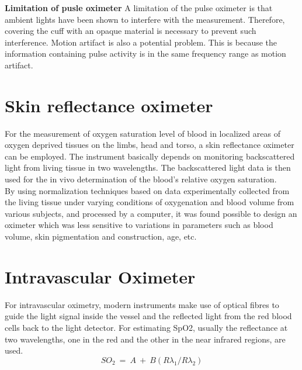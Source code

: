 \documentclass{article}
\begin{document}
\textbf{Limitation of pusle oximeter} A limitation of the pulse oximeter is that ambient lights have been shown to interfere with the measurement. Therefore, covering the cuff with an opaque material is necessary to prevent such interference. Motion artifact is also a potential problem. This is because the information containing pulse activity is in the same frequency range as motion artifact.
\section{Skin reflectance oximeter}
For the measurement of oxygen saturation level of blood in localized areas of oxygen deprived tissues on the limbs, head and torso, a skin reflectance oximeter can be employed. The instrument basically depends on monitoring backscattered light from living tissue in two wavelengths. The backscattered light data is then used for the in vivo determination of the blood’s relative oxygen saturation.\\
By using normalization techniques based on data experimentally collected from the living tissue under varying conditions of oxygenation and blood volume from various subjects, and processed by a computer, it was found possible to design an oximeter which was less sensitive to variations in parameters such as blood volume, skin pigmentation and construction, age, etc.
\section{Intravascular Oximeter}
For intravascular oximetry, modern instruments make use of optical fibres to guide the light signal inside the vessel and the reflected light from the red blood cells back to the light detector. For estimating SpO2, usually the reflectance at two wavelengths, one in the red and the other in the near infrared regions, are used.
\begin{equation}
    SO_2 \: = \: A \: + \: B(R\lambda_1 / R\lambda_2)
\end{equation}
\end{document}
